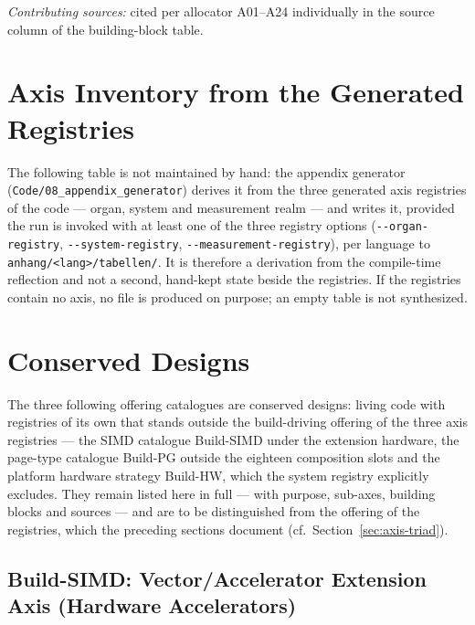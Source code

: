 \emph{Contributing sources:} cited per allocator A01--A24 individually in the source column of the building-block table.

\setlength{\tabcolsep}{6pt}

\section{Axis Inventory from the Generated Registries}

The following table is not maintained by hand: the appendix generator
(\texttt{Code/\allowbreak{}08\_\allowbreak{}appendix\_\allowbreak{}generator}) derives it from the three generated axis registries of the
code --- organ, system and measurement realm --- and writes it, provided the run is invoked with at least one of the three
registry options (\texttt{-{}-organ-registry}, \texttt{-{}-system-registry}, \texttt{-{}-measurement-registry}),
per language to \texttt{anhang/<lang>/tabellen/}. It is therefore a derivation from the
compile-time reflection and not a second, hand-kept state beside the registries. If the
registries contain no axis, no file is produced on purpose; an empty table is not
synthesized.


\section{Conserved Designs}\label{sec:app-blocks-konserviert}
The three following offering catalogues are conserved designs: living code with registries of its own that
stands outside the build-driving offering of the three axis registries --- the SIMD catalogue Build-SIMD under the
extension hardware, the page-type catalogue Build-PG outside the eighteen composition slots and the
platform hardware strategy Build-HW, which the system registry explicitly excludes. They remain listed here
in full --- with purpose, sub-axes, building blocks and sources --- and are to be distinguished from the offering of the
registries, which the preceding sections document (cf.\ Section~\ref{sec:axis-triad}).

\subsection[Build-SIMD: Vector/Accelerator Extension Axis]{Build-SIMD: Vector/\allowbreak{}Accelerator Extension Axis (Hardware Accelerators)} %

